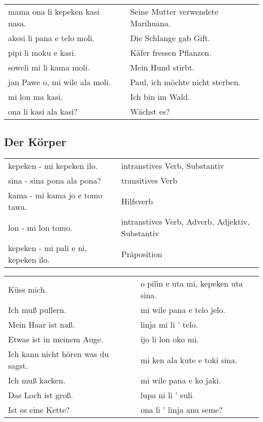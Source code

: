 \begin{supertabular}{p{5,5cm}|ll}
mama ona li kepeken kasi nasa.  && Seine Mutter verwendete Marihuana. \\
akesi li pana e telo moli.  && Die Schlange gab Gift. \\
pipi li moku e kasi.  && Käfer fressen Pflanzen. \\
soweli mi li kama moli.  && Mein Hund stirbt. \\
jan Pawe o, mi wile ala moli.  && Paul, ich möchte nicht sterben. \\
mi lon ma kasi.  && Ich bin im Wald. \\
ona li kasi ala kasi? && Wächst es? \\
\end{supertabular} 

\newpage
%
\subsection*{Der Körper} 
\label{'the_body'}

\begin{supertabular}{p{5,5cm}|ll}
kepeken - mi kepeken ilo. && intranstives Verb, Substantiv \\ %
sina - sina pona ala pona? && transitives Verb \\ %
kama - mi kama jo e tomo tawa. && Hilfsverb \\ %
lon - mi lon tomo. && intranstives Verb, Adverb, Adjektiv, Substantiv \\ %
kepeken - mi pali e ni, kepeken ilo. && Präposition  \\ %
\end{supertabular}

\begin{supertabular}{p{5,5cm}|ll}
Küss mich.  && o pilin e uta mi, kepeken uta sina. \\ %
Ich muß pullern.  && mi wile pana e telo jelo. \\ %
Mein Haar ist naß.  && linja mi li ' telo. \\ %
Etwas ist in meinem Auge.  && ijo li lon oko mi. \\ %
Ich kann nicht hören was du sagst.  && mi ken ala kute e toki sina. \\ %
Ich muß kacken.  && mi wile pana e ko jaki. \\ %
Das Loch ist groß.  && lupa ni li ' suli. \\ %
Ist es eine Kette? && ona li ' linja anu seme? \\ %
\end{supertabular}  


